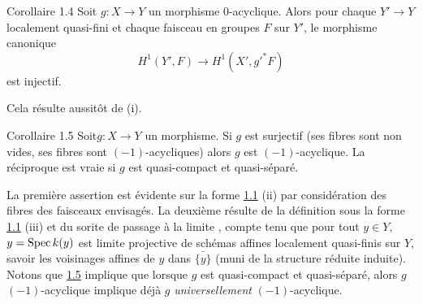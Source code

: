 \documentclass[10pt]{../fichiers-configuration-latex/smfart}
\begin{document}
\begin{enonce*}{Corollaire 1.4}
Soit $g:X\rightarrow Y$ un morphisme $0$-acyclique. Alors pour chaque
$Y'\rightarrow Y$ localement quasi-fini et chaque faisceau en groupes
$F$ sur $Y'$, le morphisme canonique
$$
H^{1}(Y',F)\longrightarrow H^{1}(X',{g'}^{\ast}F)
$$
est injectif.
\end{enonce*}

Cela résulte aussitôt de  (i).

\begin{enonce*}{Corollaire 1.5}
Soit\pageoriginale $g:X\rightarrow Y$ un morphisme. Si $g$ est
surjectif (\ie ses fibres sont non vides, \ie ses fibres sont
$(-1)$-acycliques) alors $g$ est $(-1)$-acyclique. La réciproque est
vraie si $g$ est quasi-compact et quasi-séparé.
\end{enonce*}

La première assertion est évidente sur la forme \hyperref[XV.prop1.1]{1.1} (ii) par
considération des fibres des faisceaux envisagés. La deuxième résulte
de la définition sous la forme \hyperref[XV.prop1.1]{1.1} (iii) et du sorite de
passage à la limite ,
compte tenu que pour tout $y \in Y$, $y=\operatorname{Spec} k(y)$ est
limite projective de schémas affines localement quasi-finis sur $Y$,
savoir les voisinages affines de $y$ dans $\bar{\{y\}}$ (muni de la
structure réduite induite). \sisi{}{--} Notons que \hyperref[XV.cor1.5]{1.5} implique que lorsque $g$
est quasi-compact et quasi-séparé, alors $g$ $(-1)$-acyclique implique
déjà $g$ \emph{universellement} $(-1)$-acyclique.
\end{document}
